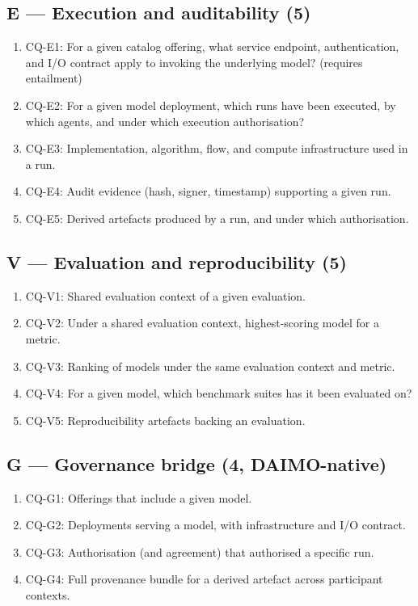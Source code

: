 \documentclass[Afour,sagev,times]{sagej}
\newcommand{\cq}[1]{\textsf{#1}}
\begin{document}
\subsection*{E --- Execution and auditability (5)}
\begin{enumerate}[label=\arabic*., leftmargin=*]
\item \cq{CQ-E1}: For a given catalog offering, what service endpoint, authentication, and I/O contract apply to invoking the underlying model? (requires entailment)
\item \cq{CQ-E2}: For a given model deployment, which runs have been executed, by which agents, and under which execution authorisation?
\item \cq{CQ-E3}: Implementation, algorithm, flow, and compute infrastructure used in a run.
\item \cq{CQ-E4}: Audit evidence (hash, signer, timestamp) supporting a given run.
\item \cq{CQ-E5}: Derived artefacts produced by a run, and under which authorisation.
\end{enumerate}

\subsection*{V --- Evaluation and reproducibility (5)}
\begin{enumerate}[label=\arabic*., leftmargin=*]
\item \cq{CQ-V1}: Shared evaluation context of a given evaluation.
\item \cq{CQ-V2}: Under a shared evaluation context, highest-scoring model for a metric.
\item \cq{CQ-V3}: Ranking of models under the same evaluation context and metric.
\item \cq{CQ-V4}: For a given model, which benchmark suites has it been evaluated on?
\item \cq{CQ-V5}: Reproducibility artefacts backing an evaluation.
\end{enumerate}

\subsection*{G --- Governance bridge (4, DAIMO-native)}
\begin{enumerate}[label=\arabic*., leftmargin=*]
\item \cq{CQ-G1}: Offerings that include a given model.
\item \cq{CQ-G2}: Deployments serving a model, with infrastructure and I/O contract.
\item \cq{CQ-G3}: Authorisation (and agreement) that authorised a specific run.
\item \cq{CQ-G4}: Full provenance bundle for a derived artefact across participant contexts.
\end{enumerate}
\end{document}

